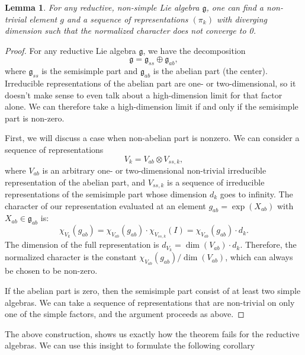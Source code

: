 \documentclass[11pt, a4paper]{article}
\newtheorem{lemma}[theorem]{Lemma}
\newtheorem{corollary}[theorem]{Corollary}
\theoremstyle{definition}
\theoremstyle{remark}
\begin{document}
\begin{lemma}
For any reductive, non-simple Lie algebra $\mathfrak{g}$, one can find a non-trivial element $g$ and a sequence of representations $(\pi_k)$ with diverging dimension such that the normalized character does not converge to 0.
\end{lemma}
\begin{proof}
    For any reductive Lie algebra $\mathfrak{g}$, we have the decomposition
    \[
        \mathfrak{g} = \mathfrak{g}_{ss} \oplus \mathfrak{g}_{ab},
    \]
    where $\mathfrak{g}_{ss}$ is the semisimple part and $\mathfrak{g}_{ab}$ is the abelian part (the center). Irreducible representations of the abelian part are one- or two-dimensional, so it doesn't make sense to even talk about a high-dimension limit for that factor alone. We can therefore take a high-dimension limit if and only if the semisimple part is non-zero.

    First, we will discuss a case when non-abelian part is nonzero. We can consider a sequence of representations
    \[
        V_k = V_{ab} \otimes V_{ss,k},
    \]
    where $V_{ab}$ is an arbitrary one- or two-dimensional non-trivial irreducible representation of the abelian part, and $V_{ss,k}$ is a sequence of irreducible representations of the semisimple part whose dimension $d_k$ goes to infinity. The character of our representation evaluated at an element $g_{ab} = \exp(X_{ab})$ with $X_{ab} \in \mathfrak{g}_{ab}$ is:
    \[
        \chi_{V_k}(g_{ab}) = \chi_{V_{ab}}(g_{ab}) \cdot \chi_{V_{ss,k}}(I) = \chi_{V_{ab}}(g_{ab}) \cdot d_k.
    \]
    The dimension of the full representation is $d_{V_k} = \dim(V_{ab}) \cdot d_k$. Therefore, the normalized character is the constant $\chi_{V_{ab}}(g_{ab})/\dim(V_{ab})$, which can always be chosen to be non-zero.

    If the abelian part is zero, then the semisimple part consist of at least two simple algebras. We can take a sequence of representations that are non-trivial on only one of the simple factors, and the argument proceeds as above.
\end{proof}

The above construction, shows us exactly how the theorem fails for the reductive algebras. We can use this insight to formulate the following corollary

\end{document}
